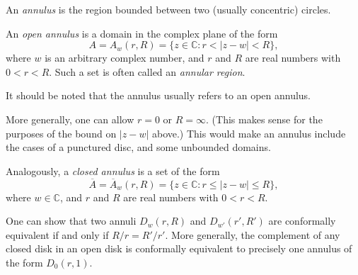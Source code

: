 \documentclass[12pt]{article}
\newcommand{\bbC}{\mathbb{C}}
\newcommand{\ov}[1]{\overline{#1}}
\begin{document}
An \emph{annulus} is the region bounded between two (usually concentric) circles.

An \emph{open annulus} is a domain in the complex plane of the form
\[
A = A_w(r,R) = \{z \in \bbC : r < |z-w| < R\},
\]
where $w$ is an arbitrary complex number, and $r$ and $R$ are real numbers with $0 < r < R$.  Such a set is often called an \emph{annular region}.

It should be noted that the  annulus usually refers to an open annulus.

More generally, one can allow $r = 0$ or $R = \infty$.  (This makes sense for the purposes of the bound on $|z-w|$ above.)  This would make an annulus include the cases of a punctured disc, and some unbounded domains.

Analogously, a \emph{closed annulus} is a set of the form
\[
\ov{A} = \ov{A}_w(r,R) = \{z \in \bbC : r \leq |z-w| \leq R\},
\]
where $w \in \bbC$, and $r$ and $R$ are real numbers with $0 < r < R$.

One can show that two annuli $D_w(r,R)$ and $D_{w'}(r',R')$ are conformally equivalent if and only if $R/r = R'/r'$.  More generally, the complement of any closed disk in an open disk is conformally equivalent to precisely one annulus of the form $D_0(r,1)$.
\end{document}
